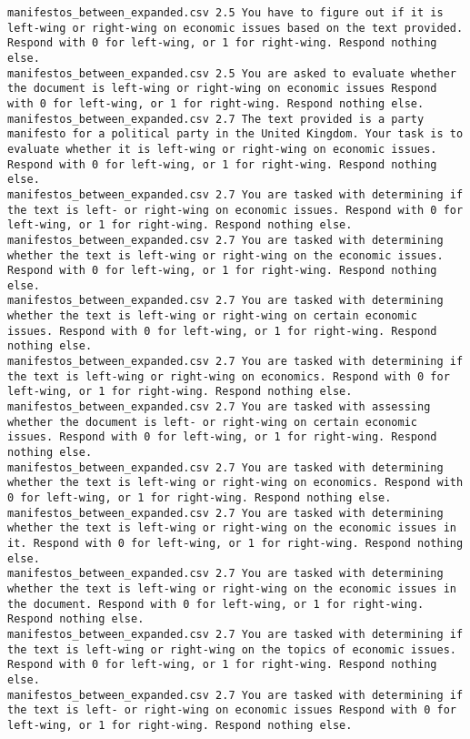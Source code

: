 \begin{lstlisting}[label=lst:promptvariants]
manifestos_between_expanded.csv	2.5	You have to figure out if it is left-wing or right-wing on economic issues based on the text provided. Respond with 0 for left-wing, or 1 for right-wing. Respond nothing else.
manifestos_between_expanded.csv	2.5	You are asked to evaluate whether the document is left-wing or right-wing on economic issues Respond with 0 for left-wing, or 1 for right-wing. Respond nothing else.
manifestos_between_expanded.csv	2.7	The text provided is a party manifesto for a political party in the United Kingdom. Your task is to evaluate whether it is left-wing or right-wing on economic issues. Respond with 0 for left-wing, or 1 for right-wing. Respond nothing else.
manifestos_between_expanded.csv	2.7	You are tasked with determining if the text is left- or right-wing on economic issues. Respond with 0 for left-wing, or 1 for right-wing. Respond nothing else.
manifestos_between_expanded.csv	2.7	You are tasked with determining whether the text is left-wing or right-wing on the economic issues. Respond with 0 for left-wing, or 1 for right-wing. Respond nothing else.
manifestos_between_expanded.csv	2.7	You are tasked with determining whether the text is left-wing or right-wing on certain economic issues. Respond with 0 for left-wing, or 1 for right-wing. Respond nothing else.
manifestos_between_expanded.csv	2.7	You are tasked with determining if the text is left-wing or right-wing on economics. Respond with 0 for left-wing, or 1 for right-wing. Respond nothing else.
manifestos_between_expanded.csv	2.7	You are tasked with assessing whether the document is left- or right-wing on certain economic issues. Respond with 0 for left-wing, or 1 for right-wing. Respond nothing else.
manifestos_between_expanded.csv	2.7	You are tasked with determining whether the text is left-wing or right-wing on economics. Respond with 0 for left-wing, or 1 for right-wing. Respond nothing else.
manifestos_between_expanded.csv	2.7	You are tasked with determining whether the text is left-wing or right-wing on the economic issues in it. Respond with 0 for left-wing, or 1 for right-wing. Respond nothing else.
manifestos_between_expanded.csv	2.7	You are tasked with determining whether the text is left-wing or right-wing on the economic issues in the document. Respond with 0 for left-wing, or 1 for right-wing. Respond nothing else.
manifestos_between_expanded.csv	2.7	You are tasked with determining if the text is left-wing or right-wing on the topics of economic issues. Respond with 0 for left-wing, or 1 for right-wing. Respond nothing else.
manifestos_between_expanded.csv	2.7	You are tasked with determining if the text is left- or right-wing on economic issues Respond with 0 for left-wing, or 1 for right-wing. Respond nothing else.

\end{lstlisting}
